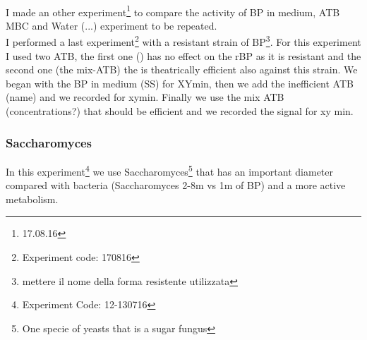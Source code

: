\documentclass[11pt, a4paper]{article}
\begin{document}
\\
I made an other experiment\footnote{17.08.16} to compare the activity of BP in medium, ATB MBC and Water (...) experiment to be repeated.\\
I performed a last experiment\footnote{Experiment code: 170816} with a resistant strain of BP\footnote{mettere il nome della forma resistente utilizzata}. For this experiment I used two ATB, the first one () has no effect on the rBP as it is resistant and the second one (the mix-ATB) the is theatrically efficient also against this strain.
We began with the BP in medium (SS) for XYmin, then we add the inefficient ATB (name) and we recorded for xymin. Finally we use the mix ATB (concentrations?) that should be efficient and we recorded the signal for xy min. 

\subsubsection{Saccharomyces}
In this experiment\footnote{Experiment Code: 12-130716} we use Saccharomyces\footnote{One specie of yeasts that is a sugar fungus} that has an important diameter compared with bacteria (Saccharomyces 2-8\textmu m vs 1\textmu m of BP) and a more active metabolism. 
\end{document}
